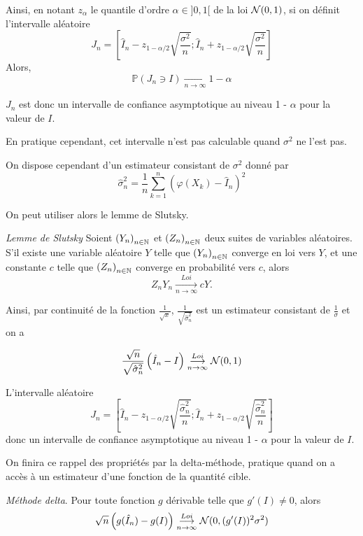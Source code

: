 Ainsi, en notant $z_{\alpha}$ le quantile d'ordre $\alpha \in]0, 1[$ de la loi $\mathcal{N} (0, 1)$, si on définit l'intervalle aléatoire 
$$J_n = \left[\hat{I}_n - z_{1 - \alpha/2}\sqrt{\frac{\sigma^2}{n}}; \hat{I}_n + z_{1 - \alpha/2}\sqrt{\frac{\sigma^2}{n}}\right]$$
Alors, 
$$\mathbb{P}(J_n \ni I) \underset{n\rightarrow \infty}{\longrightarrow} 1-\alpha$$

$J_n$ est donc un intervalle de confiance asymptotique au niveau 1 - $\alpha$ pour la valeur de $I$.

En pratique cependant, cet intervalle n'est pas calculable quand $\sigma^2$ ne l'est pas. 

On dispose cependant d'un estimateur consistant de $\sigma^2$ donné par
$$\hat{\sigma}^2_n = \frac{1}{n}\sum_{k = 1}^n \left(\varphi(X_k) - \hat{I}_n\right)^2$$

On peut utiliser alors le lemme de Slutsky.

\begin{propriete}{\textit{Lemme de Slutsky}}
\label{prop:slutsky}
Soient $\left(Y_n\right)_{n\in\mathbb{N}}$ et $\left(Z_n\right)_{n\in\mathbb{N}}$ deux suites de variables aléatoires. S'il existe une variable aléatoire $Y$ telle que $\left(Y_n\right)_{n\in\mathbb{N}}$ converge en loi vers $Y$, et une constante $c$ telle que $\left(Z_n\right)_{n\in\mathbb{N}}$ converge en probabilité vers $c$, alors  $$Z_nY_n\underset{n \rightarrow \infty}{\overset{Loi}{\longrightarrow}}cY.$$
\end{propriete}

Ainsi, par continuité de la fonction $\frac{1}{\sqrt{x}}$,  $\frac{1}{\sqrt{\hat{\sigma}^2_n}}$ est un estimateur consistant de $\frac{1}{\sigma}$ et on a

\begin{propriete}
$$\frac{\sqrt{n}}{\sqrt{\hat{\sigma}^2_n}}\left(\hat{I}_n - I\right)  \underset{n\rightarrow \infty}{\overset{Loi}{\longrightarrow}} \mathcal{N} (0, 1)$$
\end{propriete}

L'intervalle aléatoire 
$$J_n = \left[\hat{I}_n - z_{1 - \alpha/2}\sqrt{\frac{\hat{\sigma}_n^2}{n}}; \hat{I}_n + z_{1 - \alpha/2}\sqrt{\frac{\hat{\sigma}_n^2}{n}}\right]$$
 donc un intervalle de confiance asymptotique au niveau 1 - $\alpha$ pour la valeur de $I$.
 
 
 On finira ce rappel des propriétés par la delta-méthode, pratique quand on a accès à un estimateur d'une fonction de la quantité cible. 
 
\begin{propriete}{\textit{Méthode delta}}.
\label{prop:methode:delta}
Pour toute fonction $g$ dérivable telle que $g'(I) \neq 0$, alors 
$$\sqrt{n}\left(g(\hat{I}_n) - g(I)\right) \underset{n\rightarrow \infty}{\overset{Loi}{\longrightarrow}} \mathcal{N} (0, (g'(I))^2\sigma^2) $$
\end{propriete}

